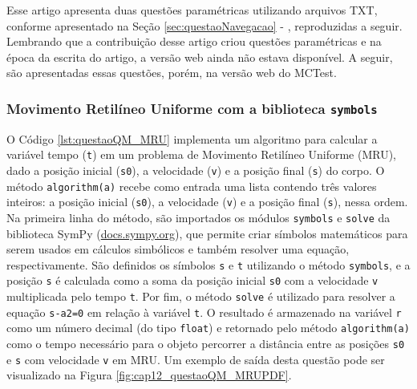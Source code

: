 Esse artigo apresenta duas questões paramétricas utilizando arquivos TXT, conforme apresentado na Seção \ref{sec:questaoNavegacao} - , reproduzidas a seguir. Lembrando que a contribuição desse artigo criou questões paramétricas e na época da escrita do artigo, a versão web ainda não estava disponível. A seguir, são apresentadas essas questões, porém, na versão web do MCTest.

\subsubsection{Movimento Retilíneo Uniforme com a biblioteca \texttt{symbols}}

O Código \ref{lst:questaoQM_MRU} implementa um algoritmo para calcular a variável tempo (\verb|t|) em um problema de Movimento Retilíneo Uniforme (MRU), dado a posição inicial (\verb|s0|), a velocidade (\verb|v|) e a posição final (\verb|s|) do corpo.
O método \verb|algorithm(a)| recebe como entrada uma lista contendo três valores inteiros: a posição inicial (\verb|s0|), a velocidade (\verb|v|) e a posição final (\verb|s|), nessa ordem.
Na primeira linha do método, são importados os módulos \verb|symbols| e \verb|solve| da biblioteca SymPy (\href{https://docs.sympy.org}{docs.sympy.org}), que permite criar símbolos matemáticos para serem usados em cálculos simbólicos e também resolver uma equação, respectivamente.
São definidos os símbolos \verb|s| e \verb|t| utilizando o método \verb|symbols|, e a posição \verb|s| é calculada como a soma da posição inicial \verb|s0| com a velocidade \verb|v| multiplicada pelo tempo \verb|t|.
Por fim, o método \verb|solve| é utilizado para resolver a equação \verb|s-a2=0| em relação à variável \verb|t|. O resultado é armazenado na variável \verb|r| como um número decimal (do tipo \verb|float|) e retornado pelo método \verb|algorithm(a)| como o tempo necessário para o objeto percorrer a distância entre as posições \verb|s0| e \verb|s| com velocidade \verb|v| em MRU. Um exemplo de saída desta questão pode ser visualizado na Figura \ref{fig:cap12_questaoQM_MRUPDF}.


